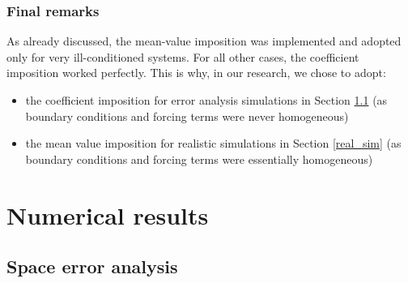 \documentclass[a4paper,11pt]{article}
\begin{document}
\subsubsection{Final remarks} \label{uniqueness_results}
\noindent As already discussed, the mean-value imposition was implemented and adopted only for very ill-conditioned systems. For all other cases, the coefficient imposition worked perfectly. This is why, in our research, we chose to adopt:
\begin{itemize}
	\item the coefficient imposition for error analysis simulations in Section \ref{error_analysis} (as boundary conditions and forcing terms were never homogeneous)
	\item the mean value imposition for realistic simulations in Section \ref{real_sim} (as boundary conditions and forcing terms were essentially homogeneous)
\end{itemize}


\newpage

\captionsetup{font=normalsize}

\section{Numerical results}
\subsection{Space error analysis}\label{error_analysis}
\end{document}
